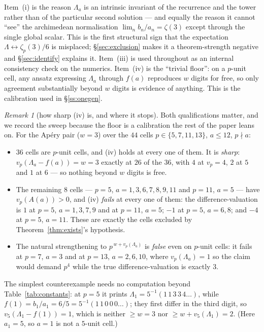 \documentclass[11pt,reqno]{article}
\newcommand{\vp}{v_p}
\theoremstyle{plain}
\theoremstyle{definition}
\theoremstyle{remark}
\newtheorem{remark}[theorem]{Remark}
\numberwithin{equation}{section}
\begin{document}
Item~(i) is the reason $\Lambda_a$ is an intrinsic invariant of the recurrence
and the tower rather than of the particular second solution --- and equally the
reason it cannot ``see'' the archimedean normalisation $\lim_nb_n/a_n=\zeta(3)$
except through the single global scalar.  This is the first structural sign that
the expectation $\Lambda\leftrightarrow\zeta_p(3)/6$ is misplaced; \S\ref{sec:exclusion}
makes it a theorem-strength negative and \S\ref{sec:identify} explains it.  Item~(iii)
is used throughout as an internal consistency check on the numerics.  Item~(iv)
is the ``trivial floor'': on a $p$-unit cell, any ansatz expressing $\Lambda_a$ through $f(a)$
reproduces $w$ digits for free, so only agreement substantially beyond $w$
digits is evidence of anything.  This is the calibration used in
\S\ref{ss:onegen}.

\begin{remark}[how sharp (iv) is, and where it stops]\label{rem:ivsharp}
Both qualifications matter, and we record the sweep because the floor is a calibration the rest
of the paper leans on.  For the Ap\'ery pair ($w=3$) over the $44$ cells $p\in\{5,7,11,13\}$,
$a\le12$, $p\nmid a$:
\begin{itemize}[leftmargin=1.4em]
\item $36$ cells are $p$-unit cells, and (iv) holds at every one of them.  It is
  \emph{sharp}: $\vp(\Lambda_a-f(a))=w=3$ exactly at $26$ of the $36$, with $4$ at $\vp=4$,
  $2$ at $5$ and $1$ at $6$ --- so nothing beyond $w$ digits is free.
\item The remaining $8$ cells --- $p=5$, $a=1,3,6,7,8,9,11$ and $p=11$, $a=5$ --- have
  $\vp(A(a))>0$, and (iv) \emph{fails} at every one of them: the difference-valuation is $1$ at
  $p=5$, $a=1,3,7,9$ and at $p=11$, $a=5$; $-1$ at $p=5$, $a=6,8$; and $-4$ at $p=5$, $a=11$.
  These are exactly the cells excluded by Theorem~\ref{thm:exists}'s hypothesis.
\item The natural strengthening to $p^{\,w+\vp(\Lambda_a)}$ is \emph{false} even on $p$-unit
  cells: it fails at $p=7$, $a=3$ and at $p=13$, $a=2,6,10$, where $\vp(\Lambda_a)=1$ so the
  claim would demand $p^{4}$ while the true difference-valuation is exactly $3$.
\end{itemize}
The simplest counterexample needs no computation beyond Table~\ref{tab:constants}: at $p=5$ it
prints $\Lambda_1=5^{-1}(1\,1\,3\,3\,4\dots)$, while $f(1)=b_1/a_1=6/5=5^{-1}(1\,1\,0\,0\,0\dots)$;
they first differ in the third digit, so $v_5(\Lambda_1-f(1))=1$, which is neither $\ge w=3$ nor
$\ge w+v_5(\Lambda_1)=2$.  (Here $a_1=5$, so $a=1$ is not a $5$-unit cell.)
\end{remark}
\end{document}

